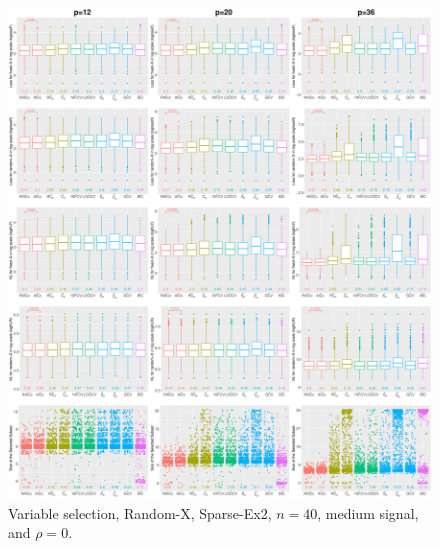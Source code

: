 \begin{figure}[!ht]
\centering
\includegraphics[width=\textwidth]{figures/supplement/randomx/subset_selection/Sparse-Ex2_n40_msnr_rho0.eps}
\caption{Variable selection, Random-X, Sparse-Ex2, $n=40$, medium signal, and $\rho=0$.}
\end{figure}
\clearpage
